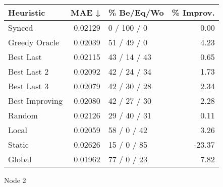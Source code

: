 \begin{tabular}{lrlr}
\toprule
\textbf{Heuristic} & \textbf{MAE ↓} & \textbf{\% Be/Eq/Wo} & \textbf{\% Improv.} \\
\midrule
            Synced &        0.02129 &          0 / 100 / 0 &                0.00 \\
     Greedy Oracle &        0.02039 &          51 / 49 / 0 &                4.23 \\
         Best Last &        0.02115 &         43 / 14 / 43 &                0.65 \\
       Best Last 2 &        0.02092 &         42 / 24 / 34 &                1.73 \\
       Best Last 3 &        0.02079 &         42 / 30 / 28 &                2.34 \\
    Best Improving &        0.02080 &         42 / 27 / 30 &                2.28 \\
            Random &        0.02126 &         29 / 40 / 31 &                0.11 \\
             Local &        0.02059 &          58 / 0 / 42 &                3.26 \\
            Static &        0.02626 &          15 / 0 / 85 &              -23.37 \\
            Global &        0.01962 &          77 / 0 / 23 &                7.82 \\
\bottomrule
\end{tabular}
\caption{Node 2}
\label{tab:iid_lr01_le1_bs2_2}
